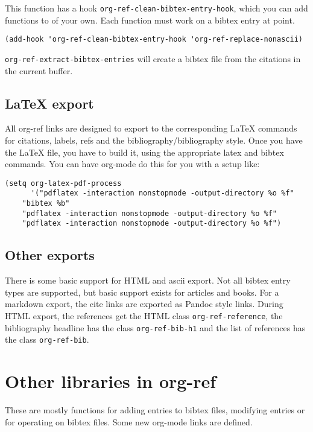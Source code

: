\documentclass[11pt]{article}
\begin{document}
This function has a hook \verb~org-ref-clean-bibtex-entry-hook~, which you can add functions to of your own. Each function must work on a bibtex entry at point.

\begin{verbatim}
(add-hook 'org-ref-clean-bibtex-entry-hook 'org-ref-replace-nonascii)
\end{verbatim}

\verb~org-ref-extract-bibtex-entries~ will create a bibtex file from the citations in the current buffer.

\subsection{\LaTeX{} export}
\label{sec-1-4}

All org-ref links are designed to export to the corresponding \LaTeX{} commands for citations, labels, refs and the bibliography/bibliography style. Once you have the \LaTeX{} file, you have to build it, using the appropriate latex and bibtex commands. You can have org-mode do this for you with a setup like:

\begin{verbatim}
(setq org-latex-pdf-process
      '("pdflatex -interaction nonstopmode -output-directory %o %f"
    "bibtex %b"
    "pdflatex -interaction nonstopmode -output-directory %o %f"
    "pdflatex -interaction nonstopmode -output-directory %o %f")
\end{verbatim}

\subsection{Other exports}
\label{sec-1-5}
 

There is some basic support for HTML and ascii export. Not all bibtex entry types are supported, but basic support exists for articles and books. For a markdown export, the cite links are exported as Pandoc style links. During HTML export, the references get the HTML class \verb~org-ref-reference~, the bibliography headline has the class \verb~org-ref-bib-h1~ and the list of references has the class \verb~org-ref-bib~.

\section{Other libraries in org-ref}
\label{sec-2}

These are mostly functions for adding entries to bibtex files, modifying entries or for operating on bibtex files. Some new org-mode links are defined.
\end{document}
